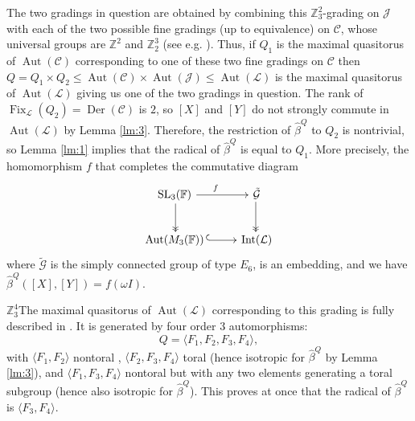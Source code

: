 \documentclass[a4paper,reqno]{amsart}
\theoremstyle{definition}
\numberwithin{theorem}{section}
\numberwithin{equation}{section}
\begin{document}
The two gradings in question are obtained by combining this ${\mathbb{Z}}_3^2$-grading on ${\mathcal{J}}$ with each of the two possible fine gradings (up to equivalence) on ${\mathcal{C}}$, whose universal groups are ${\mathbb{Z}}^2$ and ${\mathbb{Z}}_2^3$ (see e.g. \cite[\S 4.2]{EK_mon}). Thus, if $Q_1$ is the maximal quasitorus of $\operatorname{\mathrm{Aut}}({\mathcal{C}})$ corresponding to one of these two fine gradings on ${\mathcal{C}}$ then $Q=Q_1\times Q_2\leq \operatorname{\mathrm{Aut}}({\mathcal{C}})\times\operatorname{\mathrm{Aut}}({\mathcal{J}})\leq\operatorname{\mathrm{Aut}}({\mathcal{L}})$ is the maximal quasitorus of $\operatorname{\mathrm{Aut}}({\mathcal{L}})$ giving us one of the two gradings in question. The rank of $\operatorname{\mathrm{Fix}}_{\mathcal{L}}(Q_2)=\operatorname{\mathrm{Der}}({\mathcal{C}})$ is $2$, so $[X]$ and $[Y]$ do not strongly commute in $\operatorname{\mathrm{Aut}}({\mathcal{L}})$ by Lemma \ref{lm:3}. Therefore, the restriction of $\hat{\beta}^Q$ to $Q_2$ is nontrivial, so Lemma \ref{lm:1} implies that the radical of $\hat{\beta}^Q$ is equal to $Q_1$. More precisely, the homomorphism $f$ that completes the commutative diagram
\[
\xymatrix{
{\mathrm{SL}}_3({\mathbb{F}})\,\ar[r]^{f}\ar@{->>}[d] & \,\tilde{\mathcal{G}}\ar@{->>}[d]\\
\operatorname{\mathrm{Aut}}(M_3({\mathbb{F}}))\,\ar@{^{(}->}[r] & \,\operatorname{\mathrm{Int}}({\mathcal{L}})
}
\]
where $\tilde{\mathcal{G}}$ is the simply connected group of type $E_6$, is an embedding, and we have $\hat{\beta}^Q([X],[Y])=f(\omega I)$.

\medskip

$\boxed{{\mathbb{Z}}_3^4}$\quad The maximal quasitorus of $\operatorname{\mathrm{Aut}}({\mathcal{L}})$ corresponding to this grading is fully described in \cite{DV_E6}. It is generated by four order $3$ automorphisms:
\[
Q=\langle F_1,F_2,F_3,F_4\rangle,
\]
with $\langle F_1,F_2\rangle$ nontoral \cite[Lemma 9]{DV_E6}, $\langle F_2,F_3,F_4\rangle$ toral \cite[Remark 4]{DV_E6} (hence isotropic for $\hat\beta^Q$ by Lemma \ref{lm:3}), and $\langle F_1,F_3,F_4\rangle$ nontoral but with any two elements generating a toral subgroup \cite[Remark 5]{DV_E6} (hence also isotropic for $\hat\beta^Q$). This proves at once that the radical of $\hat\beta^Q$ is $\langle F_3,F_4\rangle$.
\end{document}
